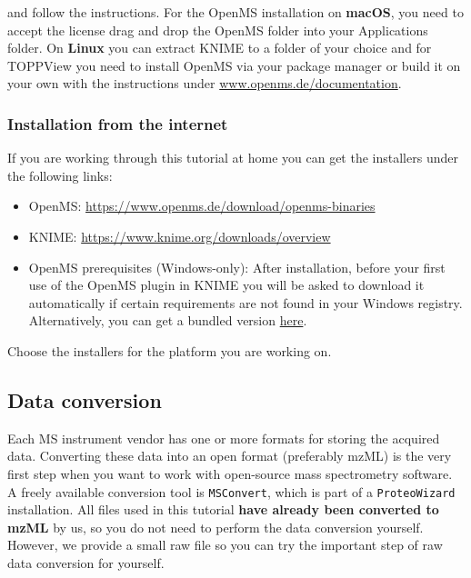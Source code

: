 and follow the instructions. For the OpenMS installation on \textbf{macOS}, you need to accept the license drag and drop the OpenMS folder into your Applications folder.
On \textbf{Linux} you can extract KNIME to a folder of your choice and for TOPPView you need to install OpenMS via your package manager or build it on your own with the instructions under \href{https://www.openms.de/documentation}{www.openms.de/documentation}.

\subsubsection{Installation from the internet}
If you are working through this tutorial at home you can get the installers under the following links:
\begin{itemize}
  \item OpenMS: \href{https://www.openms.de/download/openms-binaries}{ https://www.openms.de/download/openms-binaries}
  \item KNIME: \href{https://www.knime.org/downloads/overview}{ https://www.knime.org/downloads/overview}
  \item OpenMS prerequisites (Windows-only): After installation, before your first use of the OpenMS plugin in KNIME you will be asked to download it automatically if certain requirements are not found in your Windows registry. Alternatively, you can get a bundled version \href{\WindowsPrerequisitesLink}{here}.
\end{itemize}
Choose the installers for the platform you are working on.

\subsection{Data conversion}
\label{Data_Conversion}

Each MS instrument vendor has one or more formats for storing the acquired data. Converting these data into an open format (preferably mzML) is the very first step when you want to work with open-source mass spectrometry software. A freely available conversion tool is \texttt{MSConvert}, which is part of a \texttt{ProteoWizard} installation. All files used in this tutorial \textbf{have already been converted to mzML} by us, so you do not need to perform the data conversion yourself.
However, we provide a small raw file so you can try the important step of raw data conversion for yourself.

